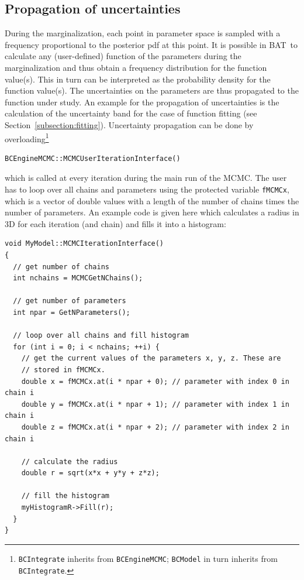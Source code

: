\documentclass[11pt, a4paper]{article}
\newcommand{\bat}{{\sc BAT}}
\newcommand{\code}[1]{\texttt{#1}}
\begin{document}

\subsection{Propagation of uncertainties}

During the marginalization, each point in parameter space is sampled
with a frequency proportional to the posterior pdf at this point. It
is possible in \bat\ to calculate any (user-defined) function of the
parameters during the marginalization and thus obtain a frequency
distribution for the function value(s). This in turn can be
interpreted as the probability density for the function value(s). The
uncertainties on the parameters are thus propagated to the function
under study. An example for the propagation of uncertainties is the
calculation of the uncertainty band for the case of function fitting
(see Section~\ref{subsection:fitting}).  Uncertainty propagation can
be done by overloading\footnote{\code{BCIntegrate} inherits from
  \code{BCEngineMCMC}; \code{BCModel} in turn inherits from
  \code{BCIntegrate}.}
%
\begin{verbatim}
BCEngineMCMC::MCMCUserIterationInterface()
\end{verbatim}
%
which is called at every iteration during the main run of the
MCMC. The user has to loop over all chains and parameters using the
protected variable \verb|fMCMCx|, which is a vector of double values
with a length of the number of chains times the number of
parameters. An example code is given here which calculates a radius in
3D for each iteration (and chain) and fills it into a histogram:

\begin{verbatim}
void MyModel::MCMCIterationInterface()
{
  // get number of chains
  int nchains = MCMCGetNChains();

  // get number of parameters
  int npar = GetNParameters();

  // loop over all chains and fill histogram
  for (int i = 0; i < nchains; ++i) {
    // get the current values of the parameters x, y, z. These are
    // stored in fMCMCx.
    double x = fMCMCx.at(i * npar + 0); // parameter with index 0 in chain i
    double y = fMCMCx.at(i * npar + 1); // parameter with index 1 in chain i
    double z = fMCMCx.at(i * npar + 2); // parameter with index 2 in chain i

    // calculate the radius
    double r = sqrt(x*x + y*y + z*z);

    // fill the histogram
    myHistogramR->Fill(r);
  }
}
\end{verbatim}
\end{document}
